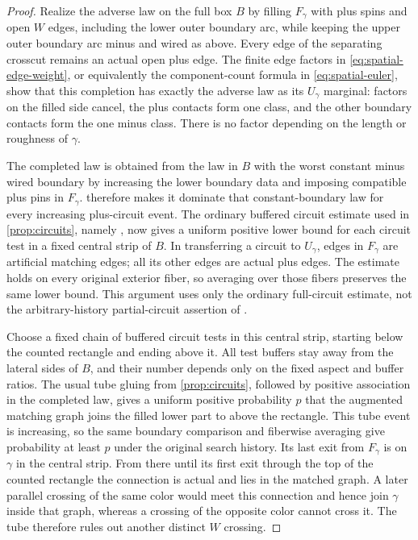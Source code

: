 \begin{proof}
Realize the adverse law on the full box $B$ by filling $F_\gamma$
with plus spins and open $W$ edges, including the lower outer boundary
arc, while keeping the upper outer boundary arc minus and wired as
above. Every edge of the separating crosscut remains an actual open
plus edge. The finite edge factors in \eqref{eq:spatial-edge-weight},
or equivalently the component-count formula in
\eqref{eq:spatial-euler}, show that this completion has exactly the
adverse law as its $U_\gamma$ marginal: factors on the filled side
cancel, the plus contacts form one class, and the other boundary
contacts form the one minus class. There is no factor depending on
the length or roughness of $\gamma$.

The completed law is obtained from the law in $B$ with the worst
constant minus wired boundary by increasing the lower boundary data
and imposing compatible plus pins in $F_\gamma$.
 therefore makes it dominate that constant-boundary
law for every increasing plus-circuit event. The ordinary buffered
circuit estimate used in \cref{prop:circuits}, namely
\cite[Theorem~16.4]{DKLM2026}, now gives a uniform positive lower
bound for each circuit test in a fixed central strip of $B$.
In transferring a circuit to $U_\gamma$, edges in $F_\gamma$ are
artificial matching edges; all its other edges are actual plus edges.
The estimate holds on every original exterior fiber, so averaging
over those fibers preserves the same lower bound. This argument uses
only the ordinary full-circuit estimate, not the arbitrary-history
partial-circuit assertion of \cite[Lemma~19.4]{DKLM2026}.

Choose a fixed chain of buffered circuit tests in this central strip,
starting below the counted rectangle and ending above it. All test
buffers stay away from the lateral sides of $B$, and their number
depends only on the fixed aspect and buffer ratios. The usual tube
gluing from \cref{prop:circuits}, followed by positive association in
the completed law, gives a uniform positive probability $p$ that
the augmented matching graph joins the filled lower part to above
the rectangle. This tube event is increasing, so the same boundary
comparison and fiberwise averaging give probability at least $p$
under the original search history. Its last exit from $F_\gamma$
is on $\gamma$ in the central strip. From there until its first exit
through the top of the counted rectangle the connection is actual
and lies in the matched graph. A later parallel crossing of the
same color would meet this connection and hence join $\gamma$
inside that graph, whereas a crossing of the opposite color cannot
cross it. The tube therefore rules out another distinct $W$
crossing.


\end{proof}
